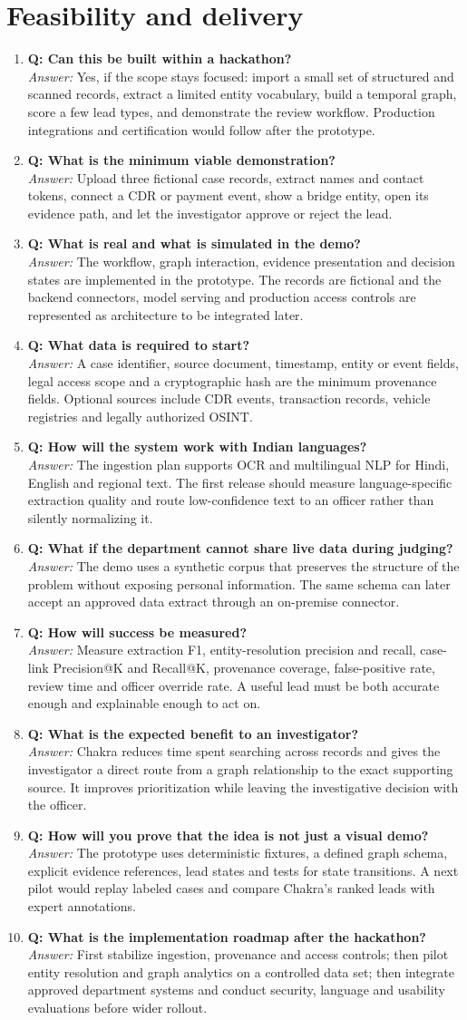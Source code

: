 \documentclass[10pt,a4paper]{article}
\newcommand{\qa}[2]{\item \textbf{\color{navy}Q: #1}\\[-1pt]{\color{coral}\textit{Answer:}} #2}
\begin{document}
\section{Feasibility and delivery}
\begin{enumerate}[resume]
\qa{Can this be built within a hackathon?}{Yes, if the scope stays focused: import a small set of structured and scanned records, extract a limited entity vocabulary, build a temporal graph, score a few lead types, and demonstrate the review workflow. Production integrations and certification would follow after the prototype.}
\qa{What is the minimum viable demonstration?}{Upload three fictional case records, extract names and contact tokens, connect a CDR or payment event, show a bridge entity, open its evidence path, and let the investigator approve or reject the lead.}
\qa{What is real and what is simulated in the demo?}{The workflow, graph interaction, evidence presentation and decision states are implemented in the prototype. The records are fictional and the backend connectors, model serving and production access controls are represented as architecture to be integrated later.}
\qa{What data is required to start?}{A case identifier, source document, timestamp, entity or event fields, legal access scope and a cryptographic hash are the minimum provenance fields. Optional sources include CDR events, transaction records, vehicle registries and legally authorized OSINT.}
\qa{How will the system work with Indian languages?}{The ingestion plan supports OCR and multilingual NLP for Hindi, English and regional text. The first release should measure language-specific extraction quality and route low-confidence text to an officer rather than silently normalizing it.}
\qa{What if the department cannot share live data during judging?}{The demo uses a synthetic corpus that preserves the structure of the problem without exposing personal information. The same schema can later accept an approved data extract through an on-premise connector.}
\qa{How will success be measured?}{Measure extraction F1, entity-resolution precision and recall, case-link Precision@K and Recall@K, provenance coverage, false-positive rate, review time and officer override rate. A useful lead must be both accurate enough and explainable enough to act on.}
\qa{What is the expected benefit to an investigator?}{Chakra reduces time spent searching across records and gives the investigator a direct route from a graph relationship to the exact supporting source. It improves prioritization while leaving the investigative decision with the officer.}
\qa{How will you prove that the idea is not just a visual demo?}{The prototype uses deterministic fixtures, a defined graph schema, explicit evidence references, lead states and tests for state transitions. A next pilot would replay labeled cases and compare Chakra's ranked leads with expert annotations.}
\qa{What is the implementation roadmap after the hackathon?}{First stabilize ingestion, provenance and access controls; then pilot entity resolution and graph analytics on a controlled data set; then integrate approved department systems and conduct security, language and usability evaluations before wider rollout.}
\end{enumerate}
\end{document}
